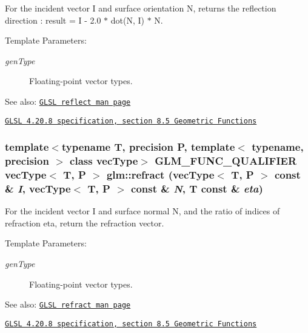 For the incident vector I and surface orientation N, returns the reflection direction : result = I - 2.0 $\ast$ dot(N, I) $\ast$ N.

\begin{Desc}
\item[Template Parameters:]
\begin{description}
\item[{\em genType}]Floating-point vector types.\end{description}
\end{Desc}
\begin{Desc}
\item[See also:]\href{http://www.opengl.org/sdk/docs/manglsl/xhtml/reflect.xml}{\tt GLSL reflect man page} 

\href{http://www.opengl.org/registry/doc/GLSLangSpec.4.20.8.pdf}{\tt GLSL 4.20.8 specification, section 8.5 Geometric Functions} \end{Desc}
\hypertarget{group__core__func__geometric_g2020e01c134ebe03c1690306ff93af53}{
\subsubsection[refract]{\setlength{\rightskip}{0pt plus 5cm}template$<$typename T, precision P, template$<$ typename, precision $>$ class vecType$>$ GLM\_\-FUNC\_\-QUALIFIER vecType$<$ T, P $>$ glm::refract (vecType$<$ T, P $>$ const \& {\em I}, \/  vecType$<$ T, P $>$ const \& {\em N}, \/  T const \& {\em eta})}}
\label{group__core__func__geometric_g2020e01c134ebe03c1690306ff93af53}


For the incident vector I and surface normal N, and the ratio of indices of refraction eta, return the refraction vector.

\begin{Desc}
\item[Template Parameters:]
\begin{description}
\item[{\em genType}]Floating-point vector types.\end{description}
\end{Desc}
\begin{Desc}
\item[See also:]\href{http://www.opengl.org/sdk/docs/manglsl/xhtml/refract.xml}{\tt GLSL refract man page} 

\href{http://www.opengl.org/registry/doc/GLSLangSpec.4.20.8.pdf}{\tt GLSL 4.20.8 specification, section 8.5 Geometric Functions} \end{Desc}
